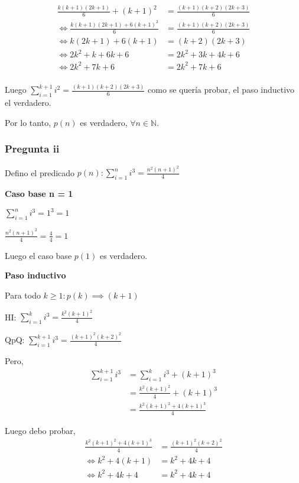 \begin{align*}
    \frac{k(k+1)(2k+1)}{6} + (k+1)^2 &= \frac{(k+1)(k+2)(2k+3)}{6} \\
    \iff \frac{k(k+1)(2k+1) + 6(k+1)^2}{6} &= \frac{(k+1)(k+2)(2k+3)}{6} \\
    \iff k(2k+1) + 6(k+1) &= (k+2)(2k+3) \\
    \iff 2k^2+k + 6k+6 &= 2k^2+3k+4k+6 \\
    \iff 2k^2+7k+6 &= 2k^2+7k+6 \\
\end{align*}

Luego $\sum_{i=1}^{k+1}i^2 =  \frac{(k+1)(k+2)(2k+3)}{6}$ como se quería probar, el paso inductivo el verdadero.

Por lo tanto, $p(n)$ es verdadero, $\forall n \in \mathbb{N}$.

\subsubsection{Pregunta ii}

Defino el predicado $p(n) : \sum_{i=1}^{n}i^3 = \frac{n^2(n+1)^2}{4}$

\textbf{Caso base n = 1}

$\sum_{i=1}^{n}i^3 = 1^3 = 1$

$\frac{n^2(n+1)^2}{4} = \frac{4}{4} = 1$

Luego el caso base $p(1)$ es verdadero.

\textbf{Paso inductivo}

Para todo $k \geq 1: p(k) \implies (k+1)$

HI: $\sum_{i=1}^{k}i^3 = \frac{k^2(k+1)^2}{4}$

QpQ: $\sum_{i=1}^{k+1}i^3 = \frac{(k+1)^2(k+2)^2}{4}$

Pero,
\begin{align*}
    \sum_{i=1}^{k+1}i^3 &= \sum_{i=1}^{k}i^3 + (k+1)^3 \\
    &= \frac{k^2(k+1)^2}{4} + (k+1)^3 \\
    &= \frac{k^2(k+1)^2 + 4(k+1)^3}{4}
\end{align*}

Luego debo probar, 
\begin{align*}
    \frac{k^2(k+1)^2 + 4(k+1)^3}{4} &= \frac{(k+1)^2(k+2)^2}{4} \\
    \iff k^2 + 4(k+1) &= k^2 + 4k + 4 \\
    \iff k^2 + 4k + 4 &= k^2 + 4k + 4 \\
\end{align*}


